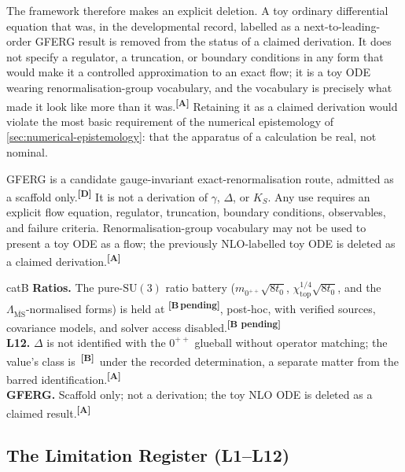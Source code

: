 \documentclass[12pt,a4paper,twoside]{article}
\theoremstyle{plain}
\theoremstyle{definition}
\theoremstyle{remark}
\newcommand{\catmark}[1]{\textsuperscript{\textsf{\textbf{[#1]}}}}
\newcommand{\Bpending}{\catmark{B\,pending}}
\begin{document}
The framework therefore makes an explicit deletion. A toy ordinary differential equation that was, in the developmental record, labelled as a next-to-leading-order GFERG result is removed from the status of a claimed derivation. It does not specify a regulator, a truncation, or boundary conditions in any form that would make it a controlled approximation to an exact flow; it is a toy ODE wearing renormalisation-group vocabulary, and the vocabulary is precisely what made it look like more than it was.\catmark{A} Retaining it as a claimed derivation would violate the most basic requirement of the numerical epistemology of \cref{sec:numerical-epistemology}: that the apparatus of a calculation be real, not nominal.

\begin{governancebox}
GFERG is a candidate gauge-invariant exact-renormalisation route, admitted as a scaffold only.\catmark{D} It is not a derivation of $\gamma$, $\Delta$, or $K_S$. Any use requires an explicit flow equation, regulator, truncation, boundary conditions, observables, and failure criteria. Renormalisation-group vocabulary may not be used to present a toy ODE as a flow; the previously NLO-labelled toy ODE is deleted as a claimed derivation.\catmark{A}
\end{governancebox}

\begin{evidencebox}{catB}
\textbf{Ratios.} The pure-$\mathrm{SU}(3)$ ratio battery ($m_{0^{++}}\sqrt{8t_0}$, $\chi_{\mathrm{top}}^{1/4}\sqrt{8t_0}$, and the $\Lambda_{\overline{\mathrm{MS}}}$-normalised forms) is held at \Bpending, post-hoc, with verified sources, covariance models, and solver access
disabled.\catmark{B pending}\\[0.3em]
\textbf{L12.} $\Delta$ is not identified with the $0^{++}$ glueball without operator matching; the value's class is~\catmark{B}\ under the recorded determination, a
separate matter from the barred identification.\catmark{A}\\[0.3em]
\textbf{GFERG.} Scaffold only; not a derivation; the toy NLO ODE is deleted as a claimed result.\catmark{A}
\end{evidencebox}

\subsection{The Limitation Register (L1--L12)}
\label{subsec:limitation-register}
\end{document}
